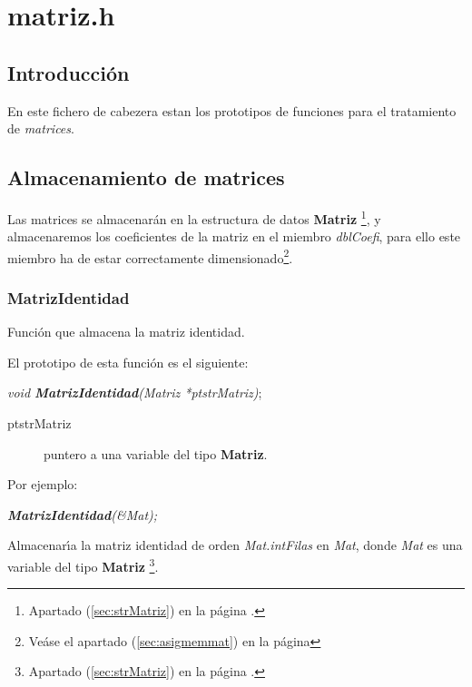 %
%

\chapter{matriz.h}

\section{Introducci\'on}
En este fichero de cabezera estan los prototipos de funciones para el
tratamiento de \emph{matrices}.

\section{Almacenamiento de matrices}
Las matrices se almacenar\'an en la estructura de datos \textbf{Matriz}%
\footnote{Apartado (\ref{sec:strMatriz}) en la p\'agina
\pageref{sec:strMatriz}.}, y almacenaremos los coeficientes de la matriz en el
miembro \emph{dblCoefi}, para ello este miembro ha de estar correctamente
dimensionado\footnote{Ve\'ase el apartado (\ref{sec:asigmemmat}) en la
p\'agina \pageref{sec:asigmemmat}}.

\subsection{MatrizIdentidad}
Funci\'on que almacena la matriz identidad.\newline

El prototipo de esta funci\'on es el siguiente:

\begin{center}
\emph{void \textbf{MatrizIdentidad}(Matriz *ptstrMatriz)};
\end{center}

\begin{description}
\item[ptstrMatriz] puntero a una variable del tipo \textbf{Matriz}.
\end{description}

Por ejemplo:

\begin{center}
\emph{\textbf{MatrizIdentidad}(\&Mat);}
\end{center}

Almacenar\'{\i}a la matriz identidad de orden \emph{Mat.intFilas} en 
\emph{Mat}, donde \emph{Mat} es una variable del tipo \textbf{Matriz}%
\footnote{Apartado (\ref{sec:strMatriz}) en la p\'agina 
\pageref{sec:strMatriz}.}.


